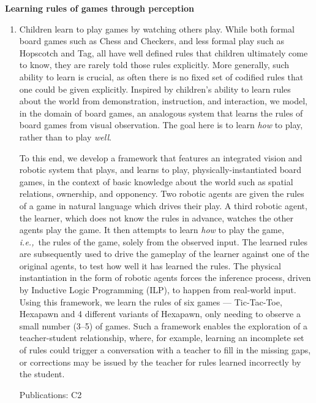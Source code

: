 \documentclass[10pt]{article}
\newenvironment{researchBlock}[1]{%
  \vspace*{0.5ex}
  {\large \textbf{#1}}
  \begin{enumerate}\item[]}
  {\end{enumerate}}
\newcommand{\refr}[1]{{\color{RoyalBlue} #1}}
\newcommand{\ie}{\emph{i.e.,}}
\begin{document}
\begin{researchBlock} {Learning rules of games through perception}
  Children learn to play games by watching others play.
  While both formal board games such as Chess and Checkers, and less formal
  play such as Hopscotch and Tag, all have well defined rules that children
  ultimately come to know, they are rarely told those rules explicitly.
  More generally, such ability to learn is crucial, as often there is no fixed
  set of codified rules that one could be given explicitly.
  Inspired by children's ability to learn rules about the world from
  demonstration, instruction, and interaction, we model, in the domain of board
  games, an analogous system that learns the rules of board games from visual
  observation.
  The goal here is to learn \emph{how} to play, rather than to play
  \emph{well}.

  To this end, we develop a framework that features an integrated vision and
  robotic system that plays, and learns to play, physically-instantiated board
  games, in the context of basic knowledge about the world such as spatial
  relations, ownership, and opponency.
  Two robotic agents are given the rules of a game in natural language which
  drives their play. A third robotic agent, the learner, which does not know
  the rules in advance, watches the other agents play the game.
  It then attempts to learn \emph{how} to play the game, \ie\ the rules of the
  game, solely from the observed input.
  The learned rules are subsequently used to drive the gameplay of the learner
  against one of the original agents, to test how well it has learned the
  rules.
  The physical instantiation in the form of robotic agents forces the inference
  process, driven by Inductive Logic Programming (ILP), to happen from
  real-world input.
  Using this framework, we learn the rules of six games --- Tic-Tac-Toe,
  Hexapawn and 4 different variants of Hexapawn, only needing to observe a
  small number (3--5) of games.
  Such a framework enables the exploration of a teacher-student relationship,
  where, for example, learning an incomplete set of rules could trigger a
  conversation with a teacher to fill in the missing gaps, or corrections may
  be issued by the teacher for rules learned incorrectly by the student.

  Publications: \refr{C2}
\end{researchBlock}
\end{document}
